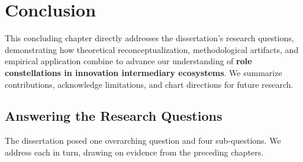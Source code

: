 \documentclass[../main.tex]{subfiles}
\begin{document}
\chapter{Conclusion}
\margintoc

\begin{chapteroverview}
This concluding chapter directly addresses the dissertation's research questions, demonstrating how theoretical reconceptualization, methodological artifacts, and empirical application combine to advance our understanding of \textbf{role constellations in innovation intermediary ecosystems}. We summarize contributions, acknowledge limitations, and chart directions for future research.
\end{chapteroverview}

\section{Answering the Research Questions}

The dissertation posed one overarching question and four sub-questions. We address each in turn, drawing on evidence from the preceding chapters.
\end{document}
